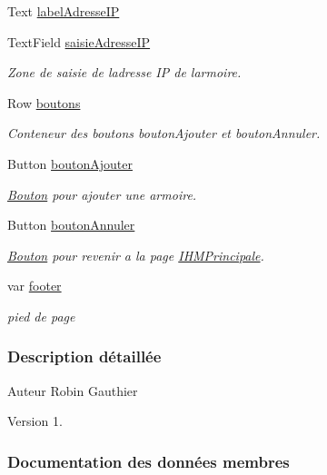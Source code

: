\begin{DoxyCompactItemize}
Text \hyperlink{class_ajout_armoire_a083da9d787ca486856523b9276f6c4a7}{label\+Adresse\+IP}
\item 
Text\+Field \hyperlink{class_ajout_armoire_a4029502b74db088c7693e967a50a0e1e}{saisie\+Adresse\+IP}
\begin{DoxyCompactList}\small\item\em Zone de saisie de l\textquotesingle{}adresse IP de l\textquotesingle{}armoire. \end{DoxyCompactList}\item 
Row \hyperlink{class_ajout_armoire_a6089975478204fa16197250fdc631160}{boutons}
\begin{DoxyCompactList}\small\item\em Conteneur des boutons bouton\+Ajouter et bouton\+Annuler. \end{DoxyCompactList}\item 
Button \hyperlink{class_ajout_armoire_ac0c584a77f9255da7ba4234fd5e89571}{bouton\+Ajouter}
\begin{DoxyCompactList}\small\item\em \hyperlink{class_bouton}{Bouton} pour ajouter une armoire. \end{DoxyCompactList}\item 
Button \hyperlink{class_ajout_armoire_a0f6f8a1144829284e0b3b05ae3675db5}{bouton\+Annuler}
\begin{DoxyCompactList}\small\item\em \hyperlink{class_bouton}{Bouton} pour revenir a la page \hyperlink{class_i_h_m_principale}{I\+H\+M\+Principale}. \end{DoxyCompactList}\item 
var \hyperlink{class_ajout_armoire_a10ec31de8aad320099ebf9a22ab42e7e}{footer}
\begin{DoxyCompactList}\small\item\em pied de page \end{DoxyCompactList}\end{DoxyCompactItemize}


\subsubsection{Description détaillée}
\begin{DoxyAuthor}{Auteur}
Robin Gauthier
\end{DoxyAuthor}
\begin{DoxyVersion}{Version}
1. 
\end{DoxyVersion}


\subsubsection{Documentation des données membres}
\mbox{\label{class_ajout_armoire_ac0c584a77f9255da7ba4234fd5e89571}} 

